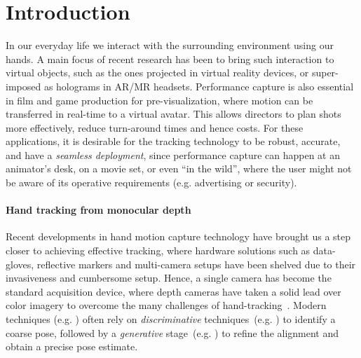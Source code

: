 \section{Introduction}
In our everyday life we interact with the surrounding environment using our hands. A main focus of recent research has been to bring such interaction to virtual objects, such as the ones projected in virtual reality devices, %
or super-imposed as holograms in AR/MR headsets. 
Performance capture is also essential in film and game production for pre-visualization, where motion can be transferred in real-time to a virtual avatar. This allows directors to plan shots more effectively, reduce turn-around times and hence costs.
For these applications, it is desirable for the tracking technology to be robust, accurate, and have a \emph{seamless deployment}, since performance capture can happen at an animator's desk, on a movie set, or even ``in the wild'',  where the user might not be aware of its operative requirements (e.g. advertising or security).

\paragraph{Hand tracking from monocular depth}
Recent developments in hand motion capture technology have brought us a step closer to achieving effective tracking, where hardware solutions such as data-gloves, reflective markers and multi-camera setups have been shelved due to their invasiveness and cumbersome setup.
Hence, a single camera has become the standard acquisition device, where depth cameras  have taken a solid lead over color imagery to overcome the many challenges of hand-tracking~\cite{supancic2015depth}. 
Modern techniques (e.g. ) often rely on \emph{discriminative} techniques~(e.g. ) to identify a coarse pose, followed by a \emph{generative} stage~(e.g. ) to refine the alignment and obtain a precise pose estimate.


